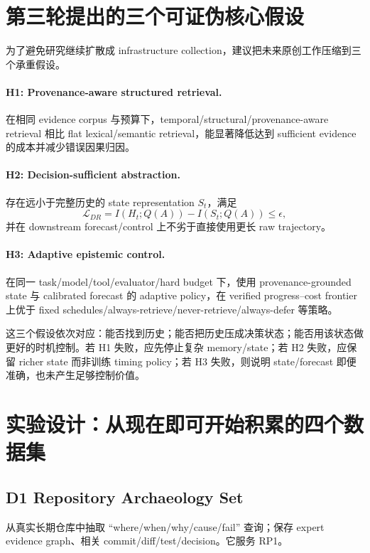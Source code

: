 \documentclass[11pt,a4paper]{ctexart}
\begin{document}
\section{第三轮提出的三个可证伪核心假设}

为了避免研究继续扩散成 infrastructure collection，建议把未来原创工作压缩到三个承重假设。

\paragraph{H1: Provenance-aware structured retrieval.}
在相同 evidence corpus 与预算下，temporal/structural/provenance-aware retrieval 相比 flat lexical/semantic retrieval，能显著降低达到 sufficient evidence 的成本并减少错误因果归因。

\paragraph{H2: Decision-sufficient abstraction.}
存在远小于完整历史的 state representation $S_t$，满足
\begin{equation}
\mathcal L_{DR}=I(H_t;Q(A))-I(S_t;Q(A))\le\epsilon,
\end{equation}
并在 downstream forecast/control 上不劣于直接使用更长 raw trajectory。

\paragraph{H3: Adaptive epistemic control.}
在同一 task/model/tool/evaluator/hard budget 下，使用 provenance-grounded state 与 calibrated forecast 的 adaptive policy，在 verified progress--cost frontier 上优于 fixed schedules/always-retrieve/never-retrieve/always-defer 等策略。

这三个假设依次对应：能否找到历史；能否把历史压成决策状态；能否用该状态做更好的时机控制。若 H1 失败，应先停止复杂 memory/state；若 H2 失败，应保留 richer state 而非训练 timing policy；若 H3 失败，则说明 state/forecast 即便准确，也未产生足够控制价值。

\section{实验设计：从现在即可开始积累的四个数据集}

\subsection{D1 Repository Archaeology Set}
从真实长期仓库中抽取 ``where/when/why/cause/fail'' 查询；保存 expert evidence graph、相关 commit/diff/test/decision。它服务 RP1。
\end{document}
